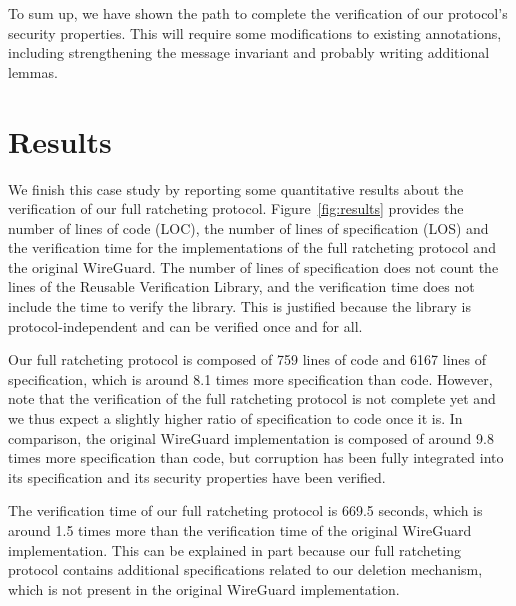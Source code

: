 To sum up, we have shown the path to complete the verification of our protocol's security properties.
This will require some modifications to existing annotations, including strengthening the message invariant and probably writing additional lemmas. 

\section{Results}
\label{sec:results}

We finish this case study by reporting some quantitative results about the verification of our full ratcheting protocol.
Figure~\ref{fig:results} provides the number of lines of code (LOC), the number of lines of specification (LOS) and the verification time for the implementations of the full ratcheting protocol and the original WireGuard.
The number of lines of specification does not count the lines of the Reusable Verification Library, and the verification time does not include the time to verify the library.
This is justified because the library is protocol-independent and can be verified once and for all.

Our full ratcheting protocol is composed of 759 lines of code and 6167 lines of specification, which is around 8.1 times more specification than code.
However, note that the verification of the full ratcheting protocol is not complete yet and we thus expect a slightly higher ratio of specification to code once it is.
In comparison, the original WireGuard implementation is composed of around 9.8 times more specification than code, but corruption has been fully integrated into its specification and its security properties have been verified.

The verification time of our full ratcheting protocol is 669.5 seconds, which is around 1.5 times more than the verification time of the original WireGuard implementation.
This can be explained in part because our full ratcheting protocol contains additional specifications related to our deletion mechanism, which is not present in the original WireGuard implementation.


